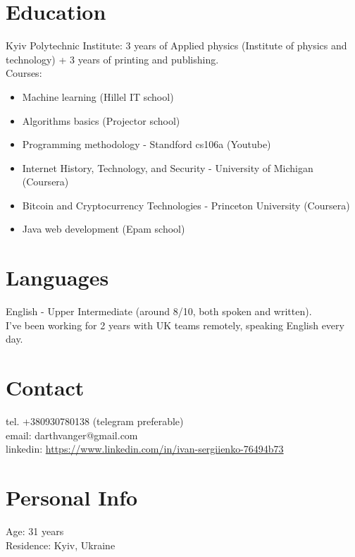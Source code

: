 \documentclass[a4paper, 14pt]{article}
\begin{document}
\section{Education}
  Kyiv Polytechnic Institute: 3 years of Applied physics (Institute of physics and technology) + 3 years of printing and publishing. \\
  Courses:
  \begin{itemize}
    \item Machine learning (Hillel IT school) \\
    \item Algorithms basics (Projector school) \\
    \item Programming methodology - Standford cs106a (Youtube) \\
    \item Internet History, Technology, and Security - University of Michigan (Coursera) \\
    \item Bitcoin and Cryptocurrency Technologies - Princeton University (Coursera) \\
    \item Java web development (Epam school)
  \end{itemize}

\section{Languages}
	English - Upper Intermediate (around 8/10, both spoken and written). \\
  I've been working for 2 years with UK teams remotely, speaking English every day.

\section{Contact}
	tel. +380930780138 (telegram preferable) \\
	email: darthvanger@gmail.com \\
  linkedin: \url{https://www.linkedin.com/in/ivan-sergiienko-76494b73} \\

\section{Personal Info}
	Age: 31 years \\
  Residence: Kyiv, Ukraine
\end{document}

